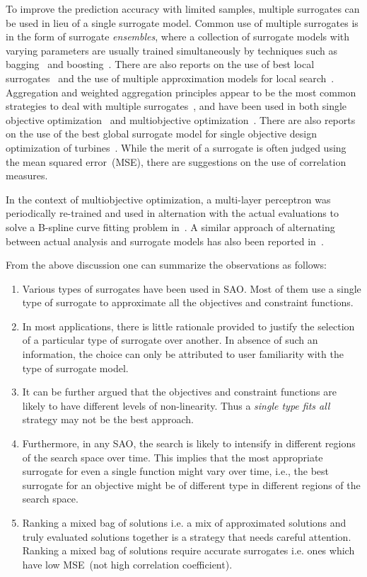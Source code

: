 To improve the prediction accuracy with limited samples, multiple surrogates can be used in lieu of
a single surrogate model. Common use of multiple surrogates is in the form of surrogate
\textit{ensembles}, where a collection of surrogate models with varying parameters are usually
trained simultaneously by techniques such as bagging~\cite{breiman_bagging_1996} and
boosting~\cite{abney_boosting_1999}. There are also reports on the use of best local
surrogates~\cite{isaacs2009multi} and the use of multiple approximation models for local
search~\cite{zhou_memetic_2007}. Aggregation and weighted aggregation principles appear to be the
most common strategies to deal with multiple
surrogates~\cite{goel_ensemble_2007,zerpa_optimization_2005, hamza2012co}, and have been used in
both single objective optimization~\cite{glaz2009rotor} and multiobjective
optimization~\cite{mack2005bluff}. There are also reports on the use of the best global surrogate
model for single objective design optimization of turbines~\cite{goel2006perf}. 
While the merit of a surrogate is often judged using the mean squared error~(MSE), there are suggestions 
on the use of correlation measures\cite{shi2008corr}. 

In the context of multiobjective optimization, a multi-layer perceptron was periodically re-trained
and used in alternation with the actual evaluations to solve a B-spline curve fitting problem
in~\cite{nain_computationally_2002}. A similar approach of alternating between actual analysis and
surrogate models has also been reported in~\cite{ray2006sae}.

From the above discussion one can summarize the observations as follows: 
\begin{enumerate} 
	\item
	Various types of surrogates have been used in SAO. Most of them use a single type of surrogate to
	approximate all the objectives and constraint functions. 
	\item In most applications, there is little rationale provided to
	justify the selection of a particular type of surrogate over another. In absence of such an information,
	the choice can only be attributed to user familiarity with the type of surrogate model.
	\item It can
	be further argued that the objectives and constraint functions are likely to have different levels
	of non-linearity. Thus a \textit{single type fits all} strategy may not be the best approach. 
	\item
	Furthermore, in any SAO, the search is likely to intensify in different regions of the search space
	over time. This implies that the most appropriate surrogate for even a single function might vary
	over time, i.e., the best surrogate for an objective might be of different type in different regions
	of the search space. 
	\item Ranking a mixed bag of solutions i.e. a mix of approximated solutions
	and truly evaluated solutions together is a strategy that needs careful attention. Ranking a mixed bag of  solutions 
	require accurate surrogates i.e. ones which have low MSE~(not high correlation coefficient).
\end{enumerate}


